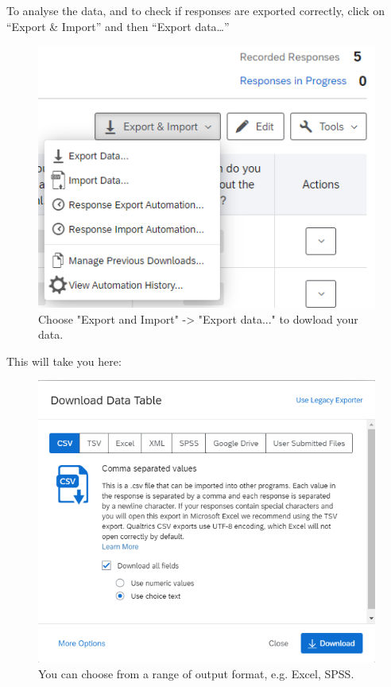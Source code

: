 \documentclass[
]{book}
\begin{document}
To analyse the data, and to check if responses are exported correctly, click on ``Export \& Import'' and then ``Export data\ldots{}''

\begin{figure}

{\centering \includegraphics[width=0.85\linewidth]{images/Qualtrics/14exportdata} 

}

\caption{Choose "Export and Import" -> "Export data..." to dowload your data.}\label{fig:Figure11-14}
\end{figure}

This will take you here:

\begin{figure}

{\centering \includegraphics[width=0.85\linewidth]{images/Qualtrics/15exportdata} 

}

\caption{You can choose from a range of output format, e.g. Excel, SPSS.}\label{fig:Figure11-15}
\end{figure}
\end{document}
